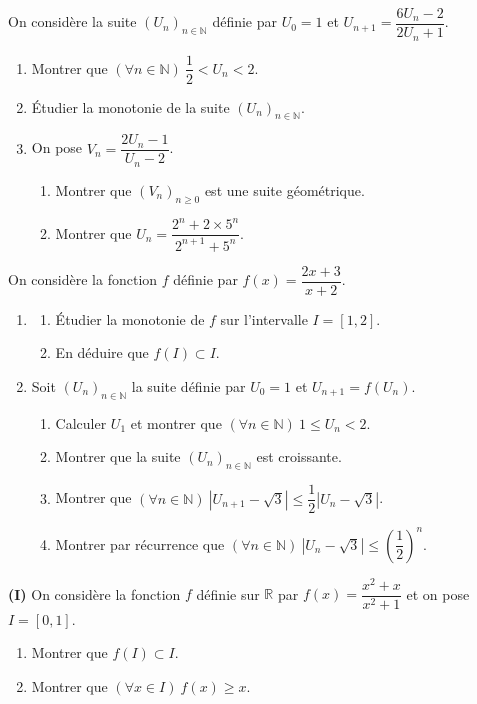 On considère la suite $(U_n)_{n\in\mathbb{N}}$ définie par $U_0=1$ et $U_{n+1}=\dfrac{6U_n-2}{2U_n+1}$.
\begin{enumerate}
\item Montrer que $(\forall n\in\mathbb{N})\ \dfrac12<U_n<2$.
\item Étudier la monotonie de la suite $(U_n)_{n\in\mathbb{N}}$.
\item On pose $V_n=\dfrac{2U_n-1}{U_n-2}$.
\begin{enumerate}
\item Montrer que $(V_n)_{n\geq0}$ est une suite géométrique.
\item Montrer que $U_n=\dfrac{2^n+2\times5^n}{2^{n+1}+5^n}$.
\end{enumerate}
\end{enumerate}
\fin
{}
On considère la fonction $f$ définie par $f(x)=\dfrac{2x+3}{x+2}$.
\begin{enumerate}
\item \begin{enumerate}
\item Étudier la monotonie de $f$ sur l'intervalle $I=[1,2]$.
\item En déduire que $f(I)\subset I$.
\end{enumerate}
\item Soit $(U_n)_{n\in\mathbb{N}}$ la suite définie par $U_0=1$ et $U_{n+1}=f(U_n)$.
\begin{enumerate}
\item Calculer $U_1$ et montrer que $(\forall n\in\mathbb{N})\ 1\leq U_n<2$.
\item Montrer que la suite $(U_n)_{n\in\mathbb{N}}$ est croissante.
\item Montrer que $(\forall n\in\mathbb{N})\ \left|U_{n+1}-\sqrt3\right|\leq\dfrac12\left|U_n-\sqrt3\right|$.
\item Montrer par récurrence que $(\forall n\in\mathbb{N})\ \left|U_n-\sqrt3\right|\leq\left(\dfrac12\right)^n$.
\end{enumerate}
\end{enumerate}
\fin
{}
\textbf{(I)} On considère la fonction $f$ définie sur $\mathbb{R}$ par $f(x)=\dfrac{x^2+x}{x^2+1}$ et on pose $I=[0,1]$.
\begin{enumerate}
\item Montrer que $f(I)\subset I$.
\item Montrer que $(\forall x\in I)\ f(x)\geq x$.
\end{enumerate}
